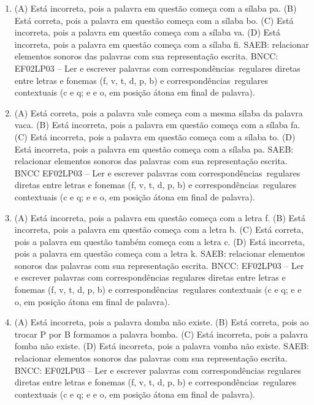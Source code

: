 
\begin{enumerate}
\item
(A) Está incorreta, pois a palavra em questão começa com a sílaba pa.
(B) Está correta, pois a palavra em questão começa com a sílaba bo.
(C) Está incorreta, pois a palavra em questão começa com a sílaba va.
(D) Está incorreta, pois a palavra em questão começa com a sílaba fi.
SAEB: relacionar elementos sonoros das palavras com sua representação escrita.
BNCC: EF02LP03 -- Ler e escrever palavras com correspondências~regulares
diretas entre letras e fonemas (f, v, t, d, p, b) e correspondências~regulares contextuais (c e q; e e o, em posição átona em final de palavra).

\item
(A) Está correta, pois a palavra vale começa com a mesma sílaba da palavra vaca.
(B) Está incorreta, pois a palavra em questão começa com a sílaba fa.
(C) Está incorreta, pois a palavra em questão começa com a sílaba to.
(D) Está incorreta, pois a palavra em questão começa com a sílaba pa.
SAEB: relacionar elementos sonoros das palavras com sua representação escrita.
BNCC EF02LP03 -- Ler e escrever palavras com correspondências~regulares
diretas entre letras e fonemas (f, v, t, d, p, b) e correspondências~regulares contextuais (c e q; e e o, em posição átona em final de palavra).

\item
(A) Está incorreta, pois a palavra em questão começa com a letra f.
(B) Está incorreta, pois a palavra em questão começa com a letra b.
(C) Está correta, pois a palavra em questão também começa com a letra c.
(D) Está incorreta, pois a palavra em questão começa com a letra k.
SAEB: relacionar elementos sonoros das palavras com sua representação escrita.
BNCC: EF02LP03 -- Ler e escrever palavras com correspondências
regulares diretas entre letras e fonemas (f, v, t, d, p, b) e
correspondências~regulares contextuais (c e q; e e o, em posição átona
em final de palavra).

\item
(A) Está incorreta, pois a palavra domba não existe.
(B) Está correta, pois ao trocar P por B formamos a palavra bomba.
(C) Está incorreta, pois a palavra fomba não existe.
(D) Está incorreta, pois a palavra vomba não existe.
SAEB: relacionar elementos sonoros das palavras com sua representação escrita.
BNCC: EF02LP03 -- Ler e escrever palavras com correspondências
regulares diretas entre letras e fonemas (f, v, t, d, p, b) e
correspondências~regulares contextuais (c e q; e e o, em posição átona
em final de palavra).


\end{enumerate}
